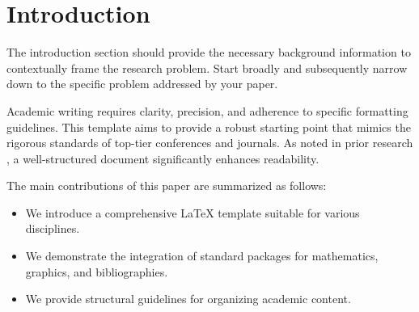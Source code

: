 \section{Introduction}
\label{sec:intro}

The introduction section should provide the necessary background information to contextually frame the research problem. Start broadly and subsequently narrow down to the specific problem addressed by your paper.

Academic writing requires clarity, precision, and adherence to specific formatting guidelines. This template aims to provide a robust starting point that mimics the rigorous standards of top-tier conferences and journals. As noted in prior research \cite{smith2023example}, a well-structured document significantly enhances readability.

The main contributions of this paper are summarized as follows:
\begin{itemize}
    \item We introduce a comprehensive LaTeX template suitable for various disciplines.
    \item We demonstrate the integration of standard packages for mathematics, graphics, and bibliographies.
    \item We provide structural guidelines for organizing academic content.
\end{itemize}
